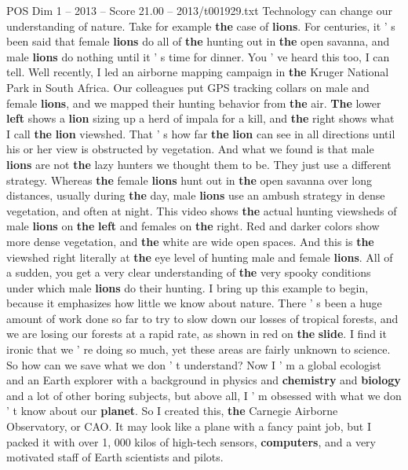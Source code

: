\begin{textsample}{POS Dim 1 – 2013 – Score 21.00 – 2013/t001929.txt}  \label{ex:f1_pos_043}
Technology can change our understanding of nature.
Take for example \textbf{the} case of \textbf{lions}.
For centuries, it ' s been said that female \textbf{lions} do all of \textbf{the} hunting out in \textbf{the} open savanna, and male \textbf{lions} do nothing until it ' s time for dinner.
You ' ve heard this too, I can tell.
Well recently, I led an airborne mapping campaign in \textbf{the} Kruger National Park in South Africa.
Our colleagues put GPS tracking collars on male and female \textbf{lions}, and we mapped their hunting behavior from \textbf{the} air. \textbf{The} lower \textbf{left} shows a \textbf{lion} sizing up a herd of impala for a kill, and \textbf{the} right shows what I call \textbf{the} \textbf{lion} viewshed.
That ' s how far \textbf{the} \textbf{lion} can see in all directions until his or her view is obstructed by vegetation.
And what we found is that male \textbf{lions} are not \textbf{the} lazy hunters we thought them to be.
They just use a different strategy.
Whereas \textbf{the} female \textbf{lions} hunt out in \textbf{the} open savanna over long distances, usually during \textbf{the} day, male \textbf{lions} use an ambush strategy in dense vegetation, and often at night.
This video shows \textbf{the} actual hunting viewsheds of male \textbf{lions} on \textbf{the} \textbf{left} and females on \textbf{the} right.
Red and darker colors show more dense vegetation, and \textbf{the} white are wide open spaces.
And this is \textbf{the} viewshed right literally at \textbf{the} eye level of hunting male and female \textbf{lions}.
All of a sudden, you get a very clear understanding of \textbf{the} very spooky conditions under which male \textbf{lions} do their hunting.
I bring up this example to begin, because it emphasizes how little we know about nature.
There ' s been a huge amount of work done so far to try to slow down our losses of tropical forests, and we are losing our forests at a rapid rate, as shown in red on \textbf{the} \textbf{slide}.
I find it ironic that we ' re doing so much, yet these areas are fairly unknown to science.
So how can we save what we don ' t understand?
Now I ' m a global ecologist and an Earth explorer with a background in physics and \textbf{chemistry} and \textbf{biology} and a lot of other boring subjects, but above all, I ' m obsessed with what we don ' t know about our \textbf{planet}.
So I created this, \textbf{the} Carnegie Airborne Observatory, or CAO.
It may look like a plane with a fancy paint job, but I packed it with over 1, 000 kilos of high-tech sensors, \textbf{computers}, and a very motivated staff of Earth scientists and pilots.

\end{textsample}
